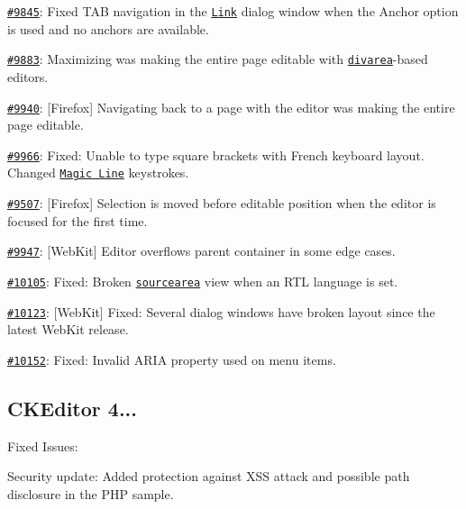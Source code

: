 {\begin{DoxyItemize}
\item \href{http://dev.ckeditor.com/ticket/9845}{\tt \#9845}\+: Fixed T\+AB navigation in the \href{http://ckeditor.com/addon/link}{\tt Link} dialog window when the Anchor option is used and no anchors are available.
\item \href{http://dev.ckeditor.com/ticket/9883}{\tt \#9883}\+: Maximizing was making the entire page editable with \href{http://ckeditor.com/addon/divarea}{\tt divarea}-\/based editors.
\item \href{http://dev.ckeditor.com/ticket/9940}{\tt \#9940}\+: \mbox{[}Firefox\mbox{]} Navigating back to a page with the editor was making the entire page editable.
\item \href{http://dev.ckeditor.com/ticket/9966}{\tt \#9966}\+: Fixed\+: Unable to type square brackets with French keyboard layout. Changed \href{http://ckeditor.com/addon/magicline}{\tt Magic Line} keystrokes.
\item \href{http://dev.ckeditor.com/ticket/9507}{\tt \#9507}\+: \mbox{[}Firefox\mbox{]} Selection is moved before editable position when the editor is focused for the first time.
\item \href{http://dev.ckeditor.com/ticket/9947}{\tt \#9947}\+: \mbox{[}Web\+Kit\mbox{]} Editor overflows parent container in some edge cases.
\item \href{http://dev.ckeditor.com/ticket/10105}{\tt \#10105}\+: Fixed\+: Broken \href{http://ckeditor.com/addon/sourcearea}{\tt sourcearea} view when an R\+TL language is set.
\item \href{http://dev.ckeditor.com/ticket/10123}{\tt \#10123}\+: \mbox{[}Web\+Kit\mbox{]} Fixed\+: Several dialog windows have broken layout since the latest Web\+Kit release.
\item \href{http://dev.ckeditor.com/ticket/10152}{\tt \#10152}\+: Fixed\+: Invalid A\+R\+IA property used on menu items.
\end{DoxyItemize}}

{\ttfamily \subsection*{C\+K\+Editor 4...}}

{\ttfamily }

{\ttfamily Fixed Issues\+:}

{\ttfamily 
\begin{DoxyItemize}
\item Security update\+: Added protection against X\+SS attack and possible path disclosure in the P\+HP sample.
\end{DoxyItemize}}

